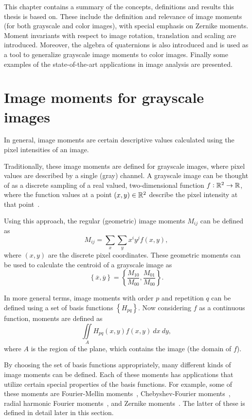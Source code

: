 This chapter contains a summary of the concepts, definitions and results this thesis is based on. These include the definition and relevance of image moments (for both grayscale and color images), with special emphasis on Zernike moments. Moment invariants with respect to image rotation, translation and scaling are introduced.
Moreover, the algebra of quaternions is also introduced and is used as a tool to generalize grayscale image moments to color images.
Finally some examples of the state-of-the-art applications in image analysis are presented.

\section{Image moments for grayscale images}
In general, image moments are certain descriptive values calculated using the pixel intensities of an image. 

Traditionally, these image moments are defined for grayscale images, where pixel values are described by a single (gray) channel. A grayscale image can be thought of as a discrete sampling of a real valued, two-dimensional function $f : \mathbb{R}^2 \rightarrow \mathbb{R}$, where the function values at a point $(x,y) \in \mathbb{R}^2$ describe the pixel intensity at that point~\cite{moment_book}.

Using this approach, the regular (geometric) image moments $M_{ij}$ can be defined as
$$
M_{ij} = \sum_x \sum_y x^iy^jf(x,y),
$$ where $(x,y)$ are the discrete pixel coordinates.
These geometric moments can be used to calculate the centroid of a grayscale image as 
$$
\left\{ \overline{x}, \overline{y} \right\} = \left\{ \frac{M_{10}}{M_{00}},  \frac{M_{01}}{M_{00}} \right\}.
$$

In more general terms, image moments with order $p$ and repetition $q$ can be defined using a set of basis functions $\left\{H_{pq}\right\}$. Now considering $f$ as a continuous function, moments are defined as
$$
\iint\limits_A H_{pq}(x,y)f(x,y)\ dx\ dy,
$$ where $A$ is the region of the plane, which contains the image (the domain of $f$).

By choosing the set of basis functions appropriately, many different kinds of image moments can be defined. Each of these moments has applications that utilize certain special properties of the basis functions. For example, some of these moments are Fourier-Mellin moments~\cite{qfmm}, Chebyshev-Fourier moments~\cite{chebyshev-fourier}, radial harmonic Fourier moments~\cite{fourier}, and Zernike moments~\cite{zernike_moments}. The latter of these is defined in detail later in this section.

